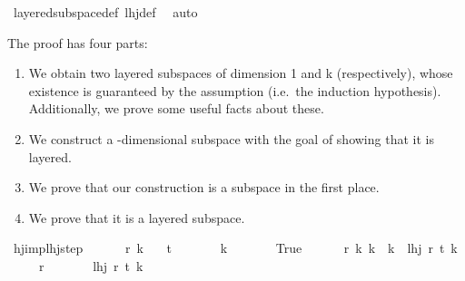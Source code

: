 \begin{isabellebody}
\ layered{\isacharunderscore}{\kern0pt}subspace{\isacharunderscore}{\kern0pt}def\ lhj{\isacharunderscore}{\kern0pt}def\ \isamarkupfalse%
\ auto\isanewline
{}\isamarkupfalse%
%
\endisatagproof
{\isafoldproof}%
%
\isadelimproof
%
\endisadelimproof
%
\isadelimdocument
%
\endisadelimdocument
%
\isatagdocument
%
\isamarkuptrue%
%
\endisatagdocument
{\isafolddocument}%
%
\isadelimdocument
%
\endisadelimdocument
%
\begin{isamarkuptext}%
The proof has four parts:
\begin{enumerate}
\item We obtain two layered subspaces of dimension 1 and k (respectively), whose existence is
guaranteed by the assumption  (i.e.\ the induction hypothesis).
Additionally, we prove some useful facts about these.
\item We construct a -dimensional subspace with the goal of showing that it is layered.
\item We prove that our construction is a subspace in the first place.
\item We prove that it is a layered subspace.
\end{enumerate}%
\end{isamarkuptext}\isamarkuptrue%
\isamarkupfalse%
\ hj{\isacharunderscore}{\kern0pt}imp{\isacharunderscore}{\kern0pt}lhj{\isacharunderscore}{\kern0pt}step{\isacharcolon}{\kern0pt}\ \isanewline
\ \ \ \ \ r\ k\isanewline
\ \ \ {\isachardoublequoteopen}t\ {\isachargreater}{\kern0pt}\ {}{\isachardoublequoteclose}\isanewline
\ \ \ \ \ {\isachardoublequoteopen}k\ {\isasymge}\ {}{\isachardoublequoteclose}\isanewline
\ \ \ \ \ {\isachardoublequoteopen}True{\isachardoublequoteclose}\ \isanewline
\ \ \ \ \ {\isachardoublequoteopen}{\isacharparenleft}{\kern0pt}{\isasymAnd}r\ k{\isacharprime}{\kern0pt}{\isachardot}{\kern0pt}\ k{\isacharprime}{\kern0pt}\ {\isasymle}\ k\ {\isasymLongrightarrow}\ lhj\ r\ t\ k{\isacharprime}{\kern0pt}{\isacharparenright}{\kern0pt}{\isachardoublequoteclose}\ \isanewline
\ \ \ \ \ {\isachardoublequoteopen}r\ {\isachargreater}{\kern0pt}\ {}{\isachardoublequoteclose}\isanewline
\ \ \ \ \ {\isachardoublequoteopen}lhj\ r\ t\ {\isacharparenleft}{\kern0pt}k{\isacharplus}{\kern0pt}{}{\isacharparenright}{\kern0pt}{\isachardoublequoteclose}\isanewline

\end{isabellebody}
